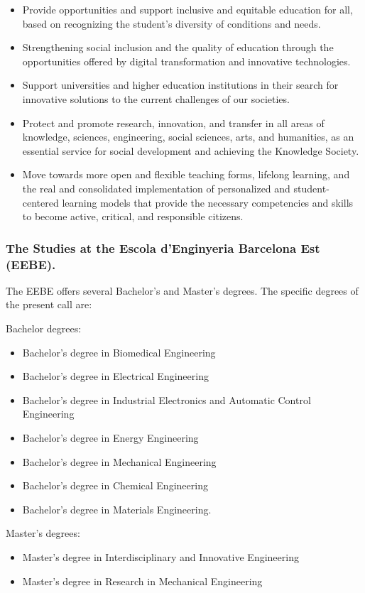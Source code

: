 \documentclass{article}
\begin{document}
\begin{itemize}
\item Provide opportunities and support inclusive and equitable education for all, based on recognizing the student's diversity of conditions and needs.
\item Strengthening social inclusion and the quality of education through the opportunities offered by digital transformation and innovative technologies.
\item Support universities and higher education institutions in their search for innovative solutions to the current challenges of our societies.
\item Protect and promote research, innovation, and transfer in all areas of knowledge, sciences, engineering, social sciences, arts, and humanities, as an essential service for social development and achieving the Knowledge Society.
\item Move towards more open and flexible teaching forms, lifelong learning, and the real and consolidated implementation of personalized and student-centered learning models that provide the necessary competencies and skills to become active, critical, and responsible citizens.
\end{itemize}

\subsubsection{The Studies at the Escola d'Enginyeria Barcelona Est (EEBE).}

The EEBE offers several Bachelor's and Master's degrees. The specific degrees of the present call are: 

Bachelor degrees:
\begin{itemize}[noitemsep]
\item Bachelor's degree in Biomedical Engineering
\item Bachelor's degree in Electrical Engineering
\item Bachelor's degree in Industrial Electronics and Automatic Control Engineering
\item Bachelor's degree in Energy Engineering
\item Bachelor's degree in Mechanical Engineering
\item Bachelor's degree in Chemical Engineering
\item Bachelor's degree in Materials Engineering.
\end{itemize}

Master's degrees:
\begin{itemize}[noitemsep]

\item Master's degree in Interdisciplinary and Innovative Engineering
\item Master's degree in Research in Mechanical Engineering
\end{itemize}
\end{document}
